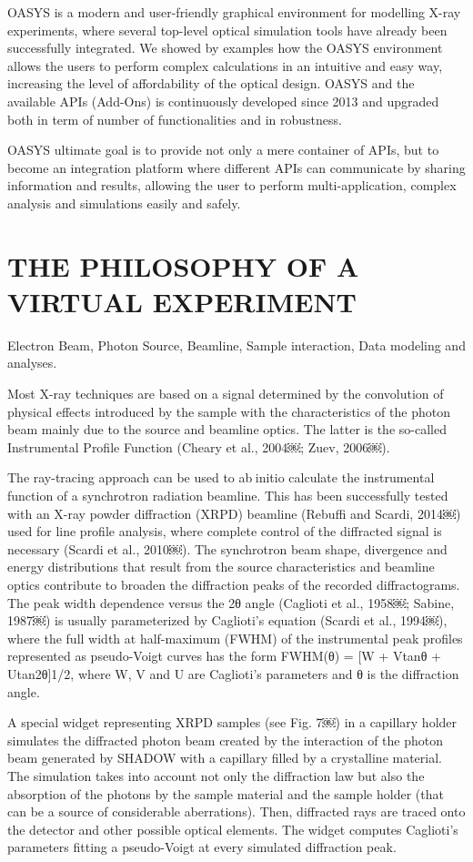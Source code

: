 \documentclass{aip-cp}
\begin{document}
OASYS is a modern and user-friendly graphical environment for modelling X-ray experiments, where several top-level optical simulation tools have already been successfully integrated. We showed by examples how the OASYS environment allows the users to perform complex calculations in an intuitive and easy way, increasing the level of affordability of the optical design. OASYS and the available APIs (Add-Ons) is continuously developed since 2013 and upgraded both in term of number of functionalities and in robustness.

OASYS ultimate goal is to provide not only a mere container of APIs, but to become an integration platform where different APIs can communicate by sharing information and results, allowing the user to perform multi-application, complex analysis and simulations easily and safely.

\section{THE PHILOSOPHY OF A VIRTUAL EXPERIMENT}

Electron Beam, Photon Source, Beamline, Sample interaction, Data modeling and analyses. 

Most X-ray techniques are based on a signal determined by the convolution of physical effects introduced by the sample with the characteristics of the photon beam mainly due to the source and beamline optics. The latter is the so-called Instrumental Profile Function (Cheary et al., 2004￼; Zuev, 2006￼).

The ray-tracing approach can be used to ab initio calculate the instrumental function of a synchrotron radiation beamline. This has been successfully tested with an X-ray powder diffraction (XRPD) beamline (Rebuffi and Scardi, 2014￼) used for line profile analysis, where complete control of the diffracted signal is necessary (Scardi et al., 2010￼). The synchrotron beam shape, divergence and energy distributions that result from the source characteristics and beamline optics contribute to broaden the diffraction peaks of the recorded diffractograms. The peak width dependence versus the 2θ angle (Caglioti et al., 1958￼; Sabine, 1987￼) is usually parameterized by Caglioti's equation (Scardi et al., 1994￼), where the full width at half-maximum (FWHM) of the instrumental peak profiles represented as pseudo-Voigt curves has the form FWHM(θ) = [W + Vtanθ + Utan2θ]1/2, where W, V and U are Caglioti's parameters and θ is the diffraction angle.

A special widget representing XRPD samples (see Fig. 7￼) in a capillary holder simulates the diffracted photon beam created by the interaction of the photon beam generated by SHADOW with a capillary filled by a crystalline material. The simulation takes into account not only the diffraction law but also the absorption of the photons by the sample material and the sample holder (that can be a source of considerable aberrations). Then, diffracted rays are traced onto the detector and other possible optical elements. The widget computes Caglioti's parameters fitting a pseudo-Voigt at every simulated diffraction peak.
\end{document}
